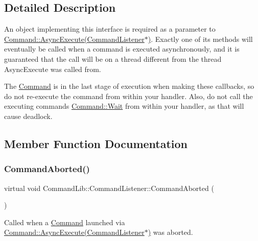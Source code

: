 \subsection{Detailed Description}
An object implementing this interface is required as a parameter to \mbox{\hyperlink{class_command_lib_1_1_command_a44bad231a0f0a6de3d5405382d95f800}{Command\+::\+Async\+Execute(\+Command\+Listener$\ast$)}}. Exactly one of its methods will eventually be called when a command is executed asynchronously, and it is guaranteed that the call will be on a thread different from the thread Async\+Execute was called from. 

The \mbox{\hyperlink{class_command_lib_1_1_command}{Command}} is in the last stage of execution when making these callbacks, so do not re-\/execute the command from within your handler. Also, do not call the executing command\textquotesingle{}s \mbox{\hyperlink{class_command_lib_1_1_command_ac4d49fbf9bbcc543fb57e4b04edf1ddb}{Command\+::\+Wait}} from within your handler, as that will cause deadlock. 

\subsection{Member Function Documentation}
\mbox{\label{class_command_lib_1_1_command_listener_aa389ff6dd3895ce4ecc9447a23e4d9fc}} 
\subsubsection{\texorpdfstring{Command\+Aborted()}{CommandAborted()}}
{\footnotesize\ttfamily virtual void Command\+Lib\+::\+Command\+Listener\+::\+Command\+Aborted (\begin{DoxyParamCaption}{ }\end{DoxyParamCaption})\hspace{0.3cm}{\ttfamily [pure virtual]}}



Called when a \mbox{\hyperlink{class_command_lib_1_1_command}{Command}} launched via \mbox{\hyperlink{class_command_lib_1_1_command_a44bad231a0f0a6de3d5405382d95f800}{Command\+::\+Async\+Execute(\+Command\+Listener$\ast$)}} was aborted. 


